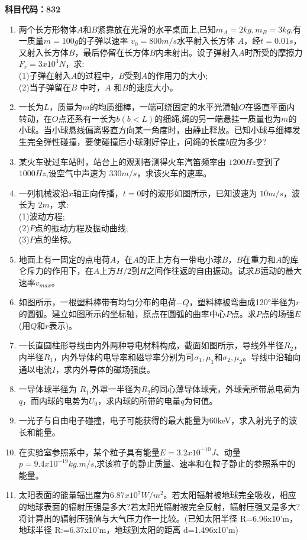 \textbf{科目代码：832}
\begin{enumerate}
\item 两个长方形物体$A$和$B$紧靠放在光滑的水平桌面上,已知$m_A=2kg,m_B=3kg$,有一质量$ m=100g$的子弹以速率 $v_0=800m/s$水平射入长方体 $A$，经$t=0.01s$，又射入长方体$B$，最后停留在长方体$B$内未射出。设子弹射入$A$时所受的摩擦力$F_r=3x10^3N$，求:\\
(1)子弹在射入$A$的过程中，$B $受到$A$的作用力的大小;\\
(2)当子弹留在$ B$ 中时，$A$ 和$B$的速度大小。
\item 一长为$L$，质量为$m$的均质细棒，一端可绕固定的水平光滑轴$O$在竖直平面内转动，在$O$点还系有一长为$b(b<L)$的细绳,绳的另一端悬挂一质量也为$m$的小球。当小球悬线偏离竖直方向某一角度时，由静止释放。已知小球与细棒发生完全弹性碰撞，要使碰撞后小球刚好停止，问绳的长度$b$应为多少?
\item 某火车驶过车站时，站台上的观测者测得火车汽笛频率由 $1200Hz$变到了 $1000 Hz$,设空气中声速为 $330m/s$，求该火车的速率。
\item 一列机械波沿$x$轴正向传播，$t=0$时的波形如图所示，已知波速为 $10m/s$，波长为 $2m$，求:\\
(1)波动方程;\\
(2)$P$点的振动方程及振动曲线;\\
(3)$P $点的坐标。
\item 地面上有一固定的点电荷$ A$，在$A$的正上方有一带电小球$B$，$B$在重力和$A$的库仑斥力的作用下，在$A$上方$ H/2 $到$H$之间作往返的自由振动。试求$B$运动的最大速率$v_{max}$。
\item  如图所示，一根塑料棒带有均匀分布的电荷$-Q$，塑料棒被弯曲成120°半径为$r$的圆弧。建立如图所示的坐标轴，原点在圆弧的曲率中心$P$点。求$P$点的场强$E$(用$Q$和$r$表示)。
\item 一长直圆柱形导线由内外两种导电材料构成，截面如图所示，导线外半径$R_2$，内半径$R_1$，内外导体的电导率和磁导率分别为可$\sigma_1,\mu_1$和$\sigma_2,\mu_2$。导线中沿轴向通以电流$I$，求内外导体的磁场强度。
\item 一导体球半径为 $R_1$,外罩一半径为$ R_2$的同心薄导体球壳，外球壳所带总电荷为$q$，而内球的电势为$ U_0$，求内球的所带的电量$ q$为何值。
\item 一光子与自由电子碰撞，电子可能获得的最大能量为60keV，求入射光子的波长和能量。
\item 在实验室参照系中，某个粒子具有能量$E=3.2x10^{-10}J$、动量$p=9.4x10^{-19}kg.m/s$,求该粒子的静止质量、速率和在粒子静止的参照系中的能量。
\item 太阳表面的能量辐出度为$6.87x10^7 W/m^2$。若太阳辐射被地球完全吸收，相应的地球表面的辐射压强是多大?若太阳光辐射被完全反射，辐射压强又是多大?将计算出的辐射压强值与大气压力作一比较。(已知太阳半径 R=6.96x10'm，地球半径 R:=6.37x10'm，地球到太阳的距离 d=1.496x10'm)
\end{enumerate}
